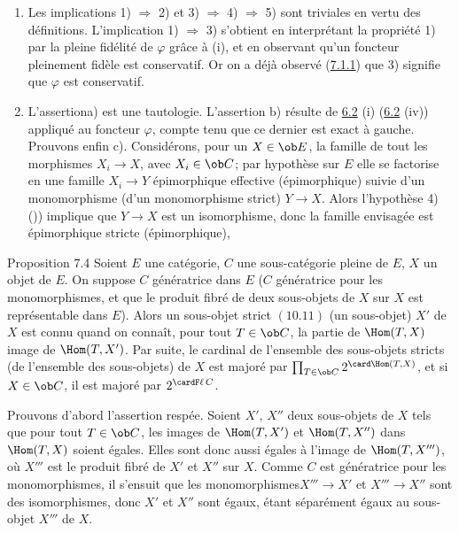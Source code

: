 \begin{enumerate}
\item Les implications 1) $\Rightarrow$ 2) et 3) $\Rightarrow$ 4)
  $\Rightarrow$ 5) sont triviales en vertu des
  définitions. L'implication 1) $\Rightarrow$ 3) s'obtient en
  interprétant la propriété 1) par la pleine fidélité de
  $\varphi$ grâce à (i), et en observant qu'un foncteur pleinement
  fidèle est conservatif. Or on a déjà observé
  (\hyperref[I.sec7.1.1]{7.1.1}) que 3)
  signifie que $\varphi$ est conservatif.

\item L'assertion\pageoriginale a) est une tautologie. L'assertion
  b) résulte de \hyperref[I.prop6.2]{6.2} (i) (\resp  \hyperref[I.prop6.2]{6.2} (iv)) appliqué au foncteur
  $\varphi$, compte tenu que ce dernier est exact à gauche. Prouvons
  enfin c). Considérons, pour un $X\in \ob E$, la famille de tout
  les morphismes $X_i\rightarrow X$, avec $X_i\in \ob C$; par
  hypothèse sur $E$ elle se factorise en une famille $X_i\rightarrow
  Y$ épimorphique effective (\resp  épimorphique) suivie d'un
  monomorphisme (\resp  d'un monomorphisme strict) $Y\rightarrow
  X$. Alors l'hypothèse 4) ()) implique que $Y\rightarrow
  X$ est un isomorphisme, donc la famille envisagée est
  épimorphique stricte (\resp  épimorphique), \cqfd
\end{enumerate}

\begin{enonce*}{Proposition 7.4}
Soient $E$ une catégorie, $C$ une sous-catégorie pleine de $E$, $X$
un objet de $E$. On suppose $C$ génératrice dans $E$ (\resp $C$
génératrice pour les monomorphismes, et que le produit fibré de deux
sous-objets de $X$ sur $X$ est représentable dans $E$). Alors un
sous-objet strict $(10.11)$ (\resp  un sous-objet) $X'$ de $X$ est
connu %
quand on connaît, pour tout $T\in \ob C$, la partie de $\Hom(T,X)$
image de $\Hom(T,X')$. Par suite, le cardinal de l'ensemble des
sous-objets stricts (\resp  de l'ensemble des sous-objets) de $X$
est majoré par $\prod_{T\in \ob C} 2^{\card
  \Hom(T,X)}$, et si $X\in \ob C$, il est majoré par $2^{\card%
F\ell\,C}$.
\end{enonce*}

Prouvons d'abord l'assertion respée. Soient $X'$, $X''$ deux
sous-objets de $X$ tels que pour tout $T\in \ob C$, les images de
$\Hom(T,X')$ et $\Hom(T,X'')$ dans $\Hom(T,X)$ soient égales. Elles
sont donc aussi égales à l'image de $\Hom(T,X''')$, où $X'''$ est le
produit fibré de $X'$ et $X''$ sur $X$. Comme $C$ est génératrice
pour les monomorphismes, il s'ensuit que les
monomorphismes\pageoriginale $X'''\rightarrow X'$ et
$X'''\rightarrow X''$ sont des isomorphismes, donc $X'$ et $X''$
sont égaux, étant séparément égaux au sous-objet $X'''$ de $X$.

